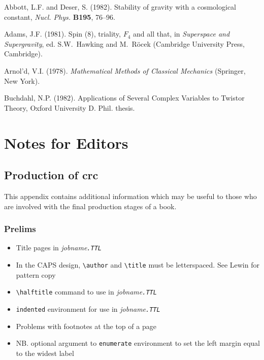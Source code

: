 \documentclass[cup6a]{cupbook}
\begin{document}
\begin{thereferences}{99}
 \label{reflist}
  Abbott, L.F. and Deser, S. (1982). Stability of gravity with a
  cosmological constant, \textit{Nucl. Phys.} \textbf{B195}, 76--96.

  Adams, J.F. (1981). Spin (8), triality, $F_4$ and all that, in
  \textit{Superspace and Supergravity}, ed. S.W.~Hawking and M.~R\"ocek
  (Cambridge University Press, Cambridge).

  Arnol'd, V.I. (1978). \textit{Mathematical Methods of Classical
  Mechanics} (Springer, New York).

  Buchdahl, N.P. (1982). Applications of Several Complex Variables to
  Twistor Theory, Oxford University D. Phil. thesis.
\end{thereferences}

\cleardoublepage
\appendix
\chapter{Notes for Editors}

\section{Production of crc}

This appendix contains additional information which may be useful to
those who are involved with the final production stages of a book.

\subsection{Prelims}
 \begin{itemize}\listsize
  \item Title pages in \textit{jobname\tt.TTL}
  \item In the CAPS design, \verb"\author" and \verb"\title" must be
        letterspaced. See Lewin for pattern copy
  \item \verb"\halftitle" command to use in \textit{jobname\tt.TTL}
  \item \texttt{indented} environment for use in \textit{jobname\tt.TTL}
  \item Problems with footnotes at the top of a page
  \item NB. optional argument to \texttt{enumerate} environment to set the
        left margin equal to the widest label
\end{itemize}
\end{document}
